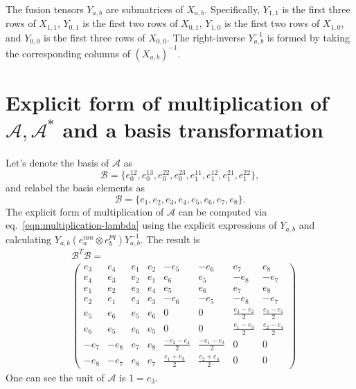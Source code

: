 \documentclass[prx, twocolumn, superscriptaddress, dvipsnames]{revtex4-2}
\theoremstyle{definition}
\newcommand{\mA}{\mathcal{A}}
\newcommand{\basis}{\mathcal{B}}
\begin{document}
The fusion tensors $Y_{a,b}$ are submatrices of $X_{a,b}$. Specifically, $Y_{1,1}$ is the first three rows of $X_{1,1}$, $Y_{0,1}$ is the first two rows of $X_{0,1}$, $Y_{1,0}$ is the first two rows of $X_{1,0}$, and $Y_{0,0}$ is the first three rows of $X_{0,0}$. The right-inverse $Y_{a,b}^{-1}$ is formed by taking the corresponding columns of $(X_{a,b})^{-1}$. 

\section{Explicit form of multiplication of $\mathcal{A},\mA^*$ and a basis transformation}
\label{app:explicit-mul-basis-trans}

Let's denote the basis of $\mA$ as
\begin{equation}
    \basis=\{e_0^{12},e_0^{13},e_0^{22},e_0^{23},e_1^{11},e_1^{12},e_1^{21},e_1^{22}\},
\end{equation}
and relabel the basis elements as
\begin{equation}
    \basis=\{e_1,e_2,e_3,e_4,e_5,e_6,e_7,e_8\}.
\end{equation}
The explicit form of multiplication of $\mA$ can be computed via eq.~\eqref{eqn:multiplication-lambda} using the explicit expressions of $Y_{a,b}$ and calculating $Y_{a,b}(e_a^{mn} \otimes e_b^{pq})Y_{a,b}^{-1}$. The result is 
\begin{equation}
\label{eq:mul-epl}
\begin{aligned}
    &\basis^T \basis = \\
    &\begin{pmatrix}
        e_3 & e_4 & e_1 & e_2 & -e_5 & -e_6 & e_7 & e_8\\
        e_4 & e_3 & e_2 & e_1 & e_6 & e_5 & -e_8 & -e_7\\
        e_1 & e_2 & e_3 & e_4 & e_5 & e_6 & e_7 & e_8\\
        e_2 & e_1 & e_4 & e_3 & -e_6 & -e_5 & -e_8 & -e_7\\
        e_5 & e_6 & e_5 & e_6 & 0 & 0 & \frac{e_4-e_2}{2} & \frac{e_3-e_1}{2}\\
        e_6 & e_5 & e_6 & e_5 & 0 & 0 & \frac{e_1-e_3}{2} & \frac{e_2-e_4}{2}\\
        -e_7 & -e_8 & e_7 & e_8 & \frac{-e_2-e_4}{2} & \frac{-e_1-e_3}{2} & 0 & 0\\
        -e_8 & -e_7 & e_8 & e_7 & \frac{e_1+e_3}{2} & \frac{e_2+e_4}{2} & 0 & 0
    \end{pmatrix}
\end{aligned}
\end{equation}
One can see the unit of $\mA$ is $1=e_3$. 
\end{document}
